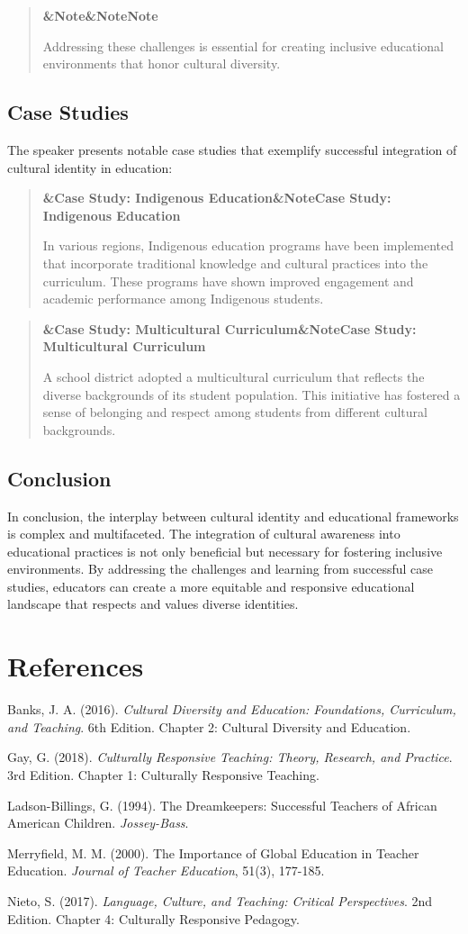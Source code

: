 \documentclass[a4paper]{article}
\newcommand{\boxheading}[1]{%
  \par\smallskip
  \noindent\textbf{\ifx&#1&Note\else#1\fi}\par
  \smallskip
}
\newenvironment{exbox}[1][]{%
  \begin{quote}\color{brown!70!black}\boxheading{#1}\normalcolor
}{\end{quote}}
\newenvironment{rembox}[1][]{%
  \begin{quote}\color{black!70}\boxheading{#1}\normalcolor
}{\end{quote}}
\begin{document}
\begin{rembox}[Note]
Addressing these challenges is essential for creating inclusive educational environments that honor cultural diversity.
\end{rembox}

\subsection{Case Studies}
The speaker presents notable case studies that exemplify successful integration of cultural identity in education:

\begin{exbox}[Case Study: Indigenous Education]
In various regions, Indigenous education programs have been implemented that incorporate traditional knowledge and cultural practices into the curriculum. These programs have shown improved engagement and academic performance among Indigenous students.
\end{exbox}

\begin{exbox}[Case Study: Multicultural Curriculum]
A school district adopted a multicultural curriculum that reflects the diverse backgrounds of its student population. This initiative has fostered a sense of belonging and respect among students from different cultural backgrounds.
\end{exbox}

\subsection{Conclusion}
In conclusion, the interplay between cultural identity and educational frameworks is complex and multifaceted. The integration of cultural awareness into educational practices is not only beneficial but necessary for fostering inclusive environments. By addressing the challenges and learning from successful case studies, educators can create a more equitable and responsive educational landscape that respects and values diverse identities.

\section{References}
Banks, J. A. (2016). \textit{Cultural Diversity and Education: Foundations, Curriculum, and Teaching}. 6th Edition. Chapter 2: Cultural Diversity and Education.

Gay, G. (2018). \textit{Culturally Responsive Teaching: Theory, Research, and Practice}. 3rd Edition. Chapter 1: Culturally Responsive Teaching.

Ladson-Billings, G. (1994). The Dreamkeepers: Successful Teachers of African American Children. \textit{Jossey-Bass}.

Merryfield, M. M. (2000). The Importance of Global Education in Teacher Education. \textit{Journal of Teacher Education}, 51(3), 177-185.

Nieto, S. (2017). \textit{Language, Culture, and Teaching: Critical Perspectives}. 2nd Edition. Chapter 4: Culturally Responsive Pedagogy.
\end{document}
